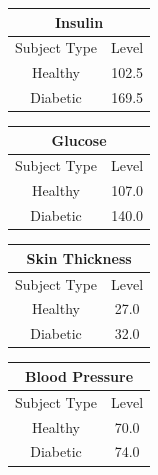 \documentclass[12pt]{article}
\begin{document}
\begin{table}[]
\centering
\begin{tabular}{|c|c|}
\hline
\multicolumn{2}{|c|}{Insulin} \\ \hline
Subject Type      & Level     \\ \hline
Healthy           & 102.5     \\ \hline
Diabetic          & 169.5     \\ \hline
\end{tabular}
\label{table:8}
\end{table}


\begin{table}[]
\centering
\begin{tabular}{|c|c|}
\hline
\multicolumn{2}{|c|}{Glucose} \\ \hline
Subject Type      & Level     \\ \hline
Healthy           & 107.0     \\ \hline
Diabetic          & 140.0     \\ \hline
\end{tabular}
\label{table:9}

\end{table}


\begin{table}[]
\centering
\begin{tabular}{|c|c|}
\hline
\multicolumn{2}{|c|}{Skin Thickness} \\ \hline
Subject Type      & Level     \\ \hline
Healthy           & 27.0     \\ \hline
Diabetic          & 32.0     \\ \hline
\end{tabular}
\label{table:10}
\end{table}



\begin{table}[]
\centering
\begin{tabular}{|c|c|}
\hline
\multicolumn{2}{|c|}{Blood Pressure} \\ \hline
Subject Type      & Level     \\ \hline
Healthy           & 70.0    \\ \hline
Diabetic          & 74.0     \\ \hline
\end{tabular}
\label{table:11}
\end{table}
\end{document}
